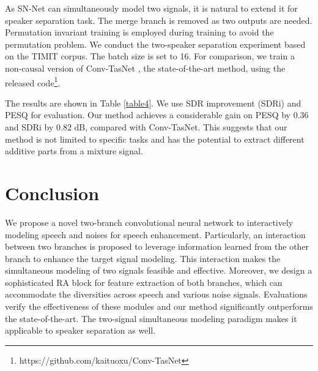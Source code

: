 \documentclass[letterpaper]{article} \usepackage{snnet}  \usepackage{times}  \usepackage{helvet} \usepackage{courier}  \usepackage[hyphens]{url}  \usepackage{graphicx} \urlstyle{rm} \def\UrlFont{\rm}  \usepackage{graphicx}  \usepackage{natbib}  \usepackage{caption} \usepackage{amsfonts}  \usepackage{amsmath}  \usepackage{multirow} \usepackage{tablefootnote}  \usepackage[switch]{lineno}
\begin{document}
\noindent As SN-Net can simultaneously model two signals, it is natural to extend it for speaker separation task. The merge branch is removed as two outputs are needed. Permutation invariant training \cite{yu2017permutation} is employed during training to avoid the permutation problem. We conduct the two-speaker separation experiment based on the TIMIT corpus. The batch size is set to 16. For comparison, we train a non-causal version of Conv-TasNet \cite{luo2019conv}, the state-of-the-art method, using the released code\footnote{https://github.com/kaituoxu/Conv-TasNet}.

The results are shown in Table \ref{table4}. We use SDR improvement (SDRi) and PESQ for evaluation. Our method achieves a considerable gain on PESQ by 0.36 and SDRi by 0.82 dB, compared with Conv-TasNet. This suggests that our method is not limited to specific tasks and has the potential to extract different additive parts from a mixture signal.

\section{Conclusion}

\noindent We propose a novel two-branch convolutional neural network to interactively modeling speech and noises for speech enhancement. Particularly, an interaction between two branches is proposed to leverage information learned from the other branch to enhance the target signal modeling. This interaction makes the simultaneous modeling of two signals feasible and effective. Moreover, we design a sophisticated RA block for feature extraction of both branches, which can accommodate the diversities across speech and various noise signals. Evaluations verify the effectiveness of these modules and our method significantly outperforms the state-of-the-art. The two-signal simultaneous modeling paradigm makes it applicable to speaker separation as well. 


\end{document}
